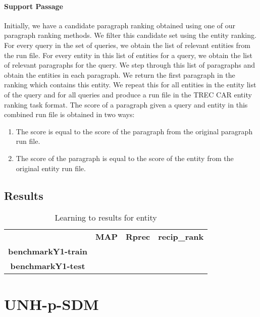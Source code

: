 \documentclass{article}
\begin{document}
\paragraph{Support Passage} Initially, we have a candidate paragraph ranking obtained using one of our paragraph ranking methods. We filter this candidate set using the entity ranking. For every query in the set of queries, we obtain the list of relevant entities from the run file. For every entity in this list of entities for a query, we obtain the list of relevant paragraphs for the query. We step through this list of paragraphs and obtain the entities in each paragraph. We return the first paragraph in the ranking which contains this entity. We  repeat this for all entities in the entity list of the query and for all queries and produce a run file in the TREC CAR entity ranking task format. The score of a paragraph given a query and entity in this combined run file is obtained in two ways:
\begin{enumerate}
\item The score is equal to the score of the paragraph from the original paragraph run file. 
\item The score of the paragraph is equal to the score of the entity from the original entity run file. 
\end{enumerate}

\subsection{Results}

\begin{table}[H]
\centering
\begin{tabular}{clll}
\multicolumn{1}{l}{}       & \multicolumn{1}{c}{\textbf{MAP}} & \multicolumn{1}{c}{\textbf{Rprec}} & \multicolumn{1}{c}{\textbf{recip\_rank}} \\
\textbf{benchmarkY1-train} &                                  &                                    &                                          \\
\textbf{benchmarkY1-test}  &                                  &                                    &                                         
\end{tabular}
\caption{Learning to results for entity}
\end{table}




\section{UNH-p-SDM}\label{sec:sdm}
\end{document}
